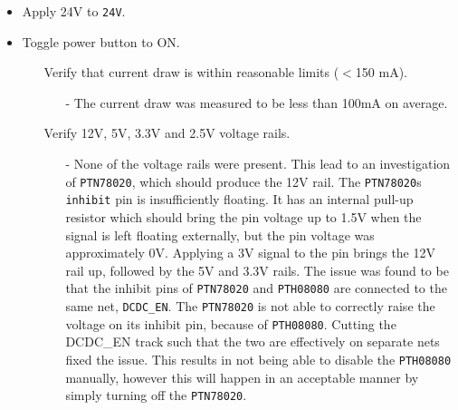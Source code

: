 \begin{itemize}
 	\item Apply 24V to \texttt{24V}.
 	\item Toggle power button to ON.
 	\begin{itemize}
 		\item[\cmark] Verify that current draw is within reasonable limits ($<$150 mA).
 			\begin{itemize}
 				\item[-] The current draw was measured to be less than 100mA on average. 
 			\end{itemize}
 		\item[\xmark] Verify 12V, 5V, 3.3V and 2.5V voltage rails.
 			\begin{itemize}
 				\item[-] None of the voltage rails were present.
 				This lead to an investigation of \texttt{PTN78020}, which should produce the 12V rail. 
 				The \texttt{PTN78020}s \texttt{inhibit} pin is insufficiently floating.
 				It has an internal pull-up resistor which should bring the pin voltage up to 1.5V when the signal is left floating externally, but the pin voltage was approximately 0V.
 				Applying a 3V signal to the pin brings the 12V rail up, followed by the 5V and 3.3V rails.
 				The issue was found to be that the inhibit pins of \texttt{PTN78020} and \texttt{PTH08080} are connected to the same net, \texttt{DCDC\_EN}.
 				The \texttt{PTN78020} is not able to correctly raise the voltage on its inhibit pin, because of \texttt{PTH08080}. 
 				Cutting the DCDC\_EN track such that the two are effectively on separate nets fixed the issue.
            	This results in not being able to disable the \texttt{PTH08080} manually, however this will happen in an acceptable manner by simply turning off the \texttt{PTN78020}.
 			\end{itemize}
 	\end{itemize}
 \end{itemize}

